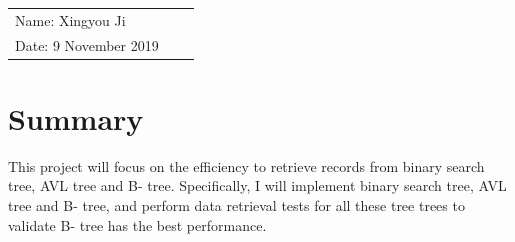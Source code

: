 \documentclass{article}
\begin{document}
\begin{spacing}{1.2}
\vspace*{0.25cm}

\thispagestyle{empty}

\begin{center}
\hrulefill

\thispagestyle{empty}


\begin{large}
\end{large}

\hrulefill

\vspace*{5cm}
\begin{Large}


\end{Large}

\vspace{2em}

\end{center}


\vfill

\begin{table}[h!]
\flushleft
\begin{tabular}{lll}
Name: Xingyou Ji \hspace*{2em}
\\
Date: 9 November 2019

\end{tabular}
\end{table}

\hfill

\newpage
\section{Summary}
This project will focus on the efficiency to retrieve records from binary search tree, AVL tree and B- tree. Specifically, I will implement binary search tree, AVL tree and B- tree, and perform data retrieval tests for all these tree trees to validate B- tree has the best performance.

\end{spacing}
\end{document}
